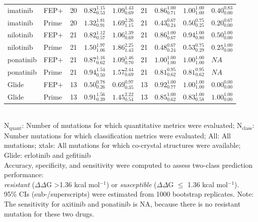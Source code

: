 \documentclass[phd,tocprelim]{cornell}
\begin{document}
\begin{landscape}
\begin{table}[p]
\begin{tabularx}{\linewidth}{X X | c X X | c X X X}
		imatinib & FEP+ & 20 & $0.82_{0.53}^{1.15}$ & $1.09_{0.69}^{1.43}$ & 21 & $0.86_{0.71}^{1.00}$ & $1.00_{1.00}^{1.00}$ & $0.40_{0.00}^{0.83}$ \\ 
		imatinib & Prime & 20 & $1.32_{0.91}^{1.81}$ & $1.69_{1.15}^{2.26}$ & 21 & $0.43_{0.24}^{0.67}$ & $0.50_{0.25}^{0.75}$ & $0.20_{0.00}^{0.67}$ \\ 
		nilotinib & FEP+ & 21 & $0.82_{0.57}^{1.12}$ & $1.06_{0.69}^{1.39}$ & 21 & $0.86_{0.67}^{1.00}$ & $0.94_{0.80}^{1.00}$ & $0.50_{0.00}^{1.00}$ \\ 
		nilotinib & Prime & 21 & $1.50_{1.06}^{1.97}$ & $1.86_{1.43}^{2.25}$ & 21 & $0.48_{0.24}^{0.67}$ & $0.53_{0.29}^{0.75}$ & $0.25_{0.00}^{1.00}$ \\ 
		ponatinib & FEP+ & 21 & $0.87_{0.62}^{1.16}$ & $1.09_{0.70}^{1.46}$ & 21 & $1.00_{1.00}^{1.00}$ & $1.00_{1.00}^{1.00}$ & $NA$ \\ 
		ponatinib & Prime & 21 & $0.94_{0.50}^{1.54}$ & $1.57_{0.69}^{2.44}$ & 21 & $0.81_{0.62}^{0.95}$ & $0.81_{0.62}^{0.95}$ & $NA$ \\ 
		Glide & FEP+ & 13 & $0.50_{0.26}^{0.78}$ & $0.69_{0.35}^{0.97}$ & 13 & $0.92_{0.77}^{1.00}$ & $1.00_{1.00}^{1.00}$ & $0.00_{0.00}^{0.00}$ \\ 
		Glide & Prime & 13 & $0.91_{0.39}^{1.56}$ & $1.45_{0.54}^{2.22}$ & 13 & $0.85_{0.62}^{1.00}$ & $0.83_{0.58}^{1.00}$ & $1.00_{0.00}^{1.00}$ \\
		\bottomrule
	\end{tabularx}
	\small
	\smallskip
	\\
	{N$_\mathrm{quant}$}: Number of mutations for which quantitative metrics were evaluated;
	{N$_\mathrm{class}$}: Number mutations for which classification metrics were evaluated;
	{All}: All mutations;
	{xtals}: All mutations for which co-crystal structures were available;
	{Glide}: erlotinib and gefitinib\\
	Accuracy, specificity, and sensitivity were computed to assess two-class prediction performance:\\
	\emph{resistant} ($\Delta \Delta$G \textgreater 1.36 kcal mol$^{-1}$) or \emph{susceptible} ($\Delta \Delta$G $\le$ 1.36 kcal mol$^{-1}$).\\
	95\% CIs (sub-/superscripts) were estimated from 1000 bootstrap replicates.
	Note: The sensitivity for axitinib and ponatinib is NA, because there is no resistant mutation for these two drugs.
\end{table}
\end{landscape}
\end{document}
